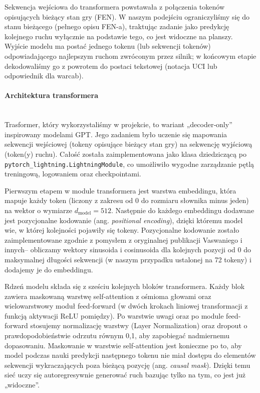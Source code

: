 \documentclass[12pt]{article}
\begin{document}
Sekwencja wejściowa do transformera powstawała z połączenia tokenów opisujących bieżący stan gry (FEN). W naszym podejściu ograniczyliśmy się do stanu bieżącego (pełnego opisu FEN-a), traktując zadanie jako predykcję kolejnego ruchu wyłącznie na podstawie tego, co jest widoczne na planszy. Wyjście modelu ma postać jednego tokenu (lub sekwencji tokenów) odpowiadającego najlepszym ruchom zwróconym przez silnik; w końcowym etapie dekodowaliśmy go z powrotem do postaci tekstowej (notacja UCI lub odpowiednik dla warcab).

\paragraph{Architektura transformera}
\\Trasformer, który wykorzystaliśmy w projekcie, to wariant „decoder‐only” inspirowany modelami GPT. Jego zadaniem było uczenie się mapowania sekwencji wejściowej (tokeny opisujące bieżący stan gry) na sekwencję wyjściową (token(y) ruchu). Całość została zaimplementowana jako klasa dziedziczącą po \\\texttt{pytorch\_lightning.LightningModule}, co umożliwiło wygodne zarządzanie pętlą treningową, logowaniem oraz checkpointami.

Pierwszym etapem w module transformera jest warstwa embeddingu, która mapuje każdy token (liczony z zakresu od 0 do rozmiaru słownika minus jeden) na wektor o wymiarze \(d_{\text{model}} = 512\). Następnie do każdego embeddingu dodawane jest pozycjonalne kodowanie (ang. \emph{positional encoding}), dzięki któremu model wie, w której kolejności pojawiły się tokeny. Pozycjonalne kodowanie zostało zaimplementowane zgodnie z pomysłem z oryginalnej publikacji Vaswaniego i innych\;– obliczamy wektory sinusoida i cosinusoida dla kolejnych pozycji od 0 do maksymalnej długości sekwencji (w naszym przypadku ustalonej na 72 tokeny) i dodajemy je do embeddingu.

Rdzeń modelu składa się z sześciu kolejnych bloków transformera. Każdy blok zawiera maskowaną warstwę self‐attention z ośmioma głowami oraz wielowarstwowy moduł feed‐forward (w dwóch krokach liniowej transformacji z funkcją aktywacji ReLU pomiędzy). Po warstwie uwagi oraz po module feed‐forward stosujemy normalizację warstwy (Layer Normalization) oraz dropout o prawdopodobieństwie odrzutu równym 0,1, aby zapobiegać nadmiernemu dopasowaniu. Maskowanie w warstwie self‐attention jest konieczne po to, aby model podczas nauki predykcji następnego tokenu nie miał dostępu do elementów sekwencji wykraczających poza bieżącą pozycję (ang. \emph{causal mask}). Dzięki temu sieć uczy się autoregresywnie generować ruch bazując tylko na tym, co jest już „widoczne”.
\end{document}

